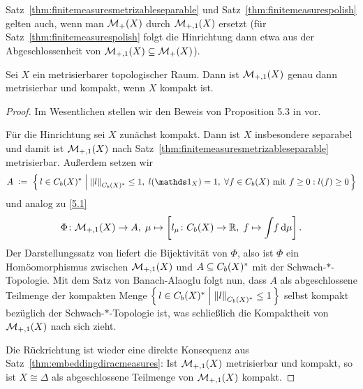 \documentclass[../main/main.tex]{subfiles}
\begin{document}
	\begin{Bemerkung}
		Satz~\ref{thm:finitemeasuresmetrizableseparable} und Satz~\ref{thm:finitemeasurespolish} gelten auch, wenn man $\mathcal{M}_{+}(X)$ durch $\mathcal{M}_{+,1}(X)$ ersetzt 
		(für Satz~\ref{thm:finitemeasurespolish} folgt die Hinrichtung dann etwa aus der Abgeschlossenheit von $\mathcal{M}_{+,1}(X) \subseteq \mathcal{M}_{+}(X)$).
	\end{Bemerkung}

	\begin{Satz}
		\label{thm:compactimpliescompactmeasures}
		Sei $X$ ein metrisierbarer topologischer Raum. Dann ist $\mathcal{M}_{+,1}(X)$ genau dann metrisierbar und kompakt, wenn $X$ kompakt ist.
	\end{Satz}
	
	\begin{proof}
		Im Wesentlichen stellen wir den Beweis von Proposition 5.3 in \cite{vanGaans.200203} vor.
		
		Für die Hinrichtung sei $X$ zunächst kompakt. Dann ist $X$ insbesondere separabel und damit ist $\mathcal{M}_{+,1}(X)$ 
		nach Satz~\ref{thm:finitemeasuresmetrizableseparable} metrisierbar.
		Außerdem setzen wir
		\[ A \; \defby \; \setcomp{l \in \Bdcontfct{X}^\ast}{\norm{l}_{\Bdcontfct{X}^\ast} \leq 1, \; l(\indfct_{X}) = 1, \; 
			\forall f \in \Bdcontfct{X} \text{ mit } f \geq 0 : l(f) \geq 0}\]
		und analog zu \eqref{5.1}
		\[ \Phi \colon \mathcal{M}_{+,1}(X) \to A, \; \mu \mapsto \left[l_\mu \colon C_b(X) \to \mathbb{R}, \; f \mapsto \int_{} \, f \, \mathrm{d}\mu \right]  \text{.} \]
		Der Darstellungssatz von  liefert die Bijektivität von $\Phi$, also ist $\Phi$ ein 
		Homöomorphismus zwischen $\mathcal{M}_{+,1}(X)$ und $A \subseteq C_b(X)^\ast$ 
		mit der Schwach-$\ast$-Topologie. Mit dem Satz von Banach-Alaoglu folgt nun, dass $A$ als abgeschlossene Teilmenge der kompakten Menge 
		$\left\{\, l \in C_b(X)^\ast \; \middle| \; \left\lVert l\right\rVert_{C_b(X)^\ast} \leq 1 \,\right\}$ selbst kompakt bezüglich der Schwach-$\ast$-Topologie ist, 
		was schließlich die Kompaktheit von $\mathcal{M}_{+,1}(X)$ nach sich zieht.
		
		Die Rückrichtung ist wieder eine direkte Konsequenz aus Satz~\ref{thm:embeddingdiracmeasures}: Ist $\mathcal{M}_{+,1}(X)$ metrisierbar und kompakt, so ist 
		$X \cong \Delta$ als abgeschlossene Teilmenge von $\mathcal{M}_{+,1}(X)$ kompakt.
	\end{proof}
	
\end{document}
